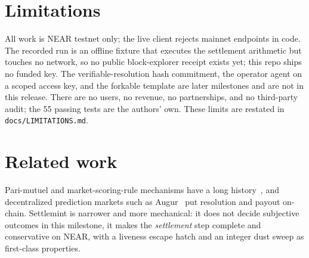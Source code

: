 \documentclass[11pt]{article}
\begin{document}
\section{Limitations}

All work is NEAR testnet only; the live client rejects mainnet endpoints in code.
The recorded run is an offline fixture that executes the settlement arithmetic
but touches no network, so no public block-explorer receipt exists yet; this repo
ships no funded key. The verifiable-resolution hash commitment, the operator
agent on a scoped access key, and the forkable template are later milestones and
are not in this release. There are no users, no revenue, no partnerships, and no
third-party audit; the 55 passing tests are the authors' own. These limits are
restated in \texttt{docs/LIMITATIONS.md}.

\section{Related work}

Pari-mutuel and market-scoring-rule mechanisms have a long
history~\cite{hanson2003combinatorial}, and decentralized prediction markets such
as Augur~\cite{peterson2019augur} put resolution and payout on-chain. Settlemint
is narrower and more mechanical: it does not decide subjective outcomes in this
milestone, it makes the \emph{settlement} step complete and conservative on NEAR,
with a liveness escape hatch and an integer dust sweep as first-class properties.



\end{document}
